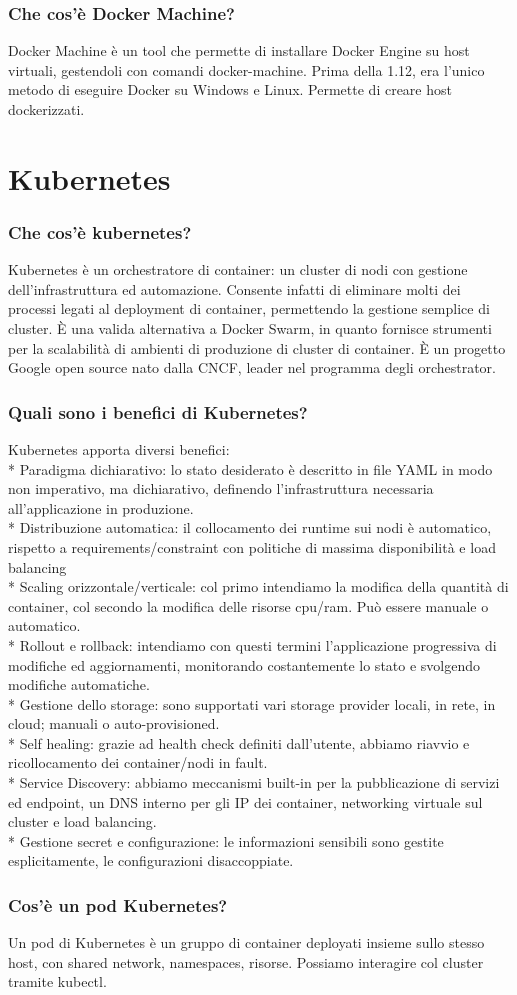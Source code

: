 \documentclass[11pt]{article}
\begin{document}
\subsubsection{Che cos'è Docker Machine?}
Docker Machine è un tool che permette di installare Docker Engine su host virtuali, gestendoli con comandi docker-machine. Prima della 1.12, era l'unico metodo di eseguire Docker su Windows e Linux. Permette di creare host dockerizzati.




\section{Kubernetes}
\subsubsection{Che cos'è kubernetes?}
Kubernetes è un orchestratore di container: un cluster di nodi con gestione dell'infrastruttura ed automazione. Consente infatti di eliminare molti dei processi legati al deployment di container, permettendo la gestione semplice di cluster. È una valida alternativa a Docker Swarm, in quanto fornisce strumenti per la scalabilità di ambienti di produzione di cluster di container. È un progetto Google open source nato dalla CNCF, leader nel programma degli orchestrator. 
\subsubsection{Quali sono i benefici di Kubernetes?}
Kubernetes apporta diversi benefici:
\\* Paradigma dichiarativo: lo stato desiderato è descritto in file YAML in modo non imperativo, ma dichiarativo, definendo l'infrastruttura necessaria all'applicazione in produzione.
\\* Distribuzione automatica: il collocamento dei runtime sui nodi è automatico, rispetto a requirements/constraint con politiche di massima disponibilità e load balancing
\\* Scaling orizzontale/verticale: col primo intendiamo la modifica della quantità di container, col secondo la modifica delle risorse cpu/ram. Può essere manuale o automatico.
\\* Rollout e rollback: intendiamo con questi termini l'applicazione progressiva di modifiche ed aggiornamenti, monitorando costantemente lo stato e svolgendo modifiche automatiche. 
\\* Gestione dello storage: sono supportati vari storage provider locali, in rete, in cloud; manuali o auto-provisioned.
\\* Self healing: grazie ad health check definiti dall'utente, abbiamo riavvio e ricollocamento dei container/nodi in fault.
\\* Service Discovery: abbiamo meccanismi built-in per la pubblicazione di servizi ed endpoint, un DNS interno per gli IP dei container, networking virtuale sul cluster e load balancing.
\\* Gestione secret e configurazione: le informazioni sensibili sono gestite esplicitamente, le configurazioni disaccoppiate.

\subsubsection{Cos'è un pod Kubernetes?}
Un pod di Kubernetes è un gruppo di container deployati insieme sullo stesso host, con shared network, namespaces, risorse. Possiamo interagire col cluster tramite kubectl.
\end{document}
